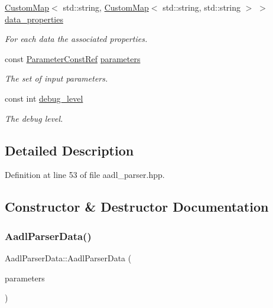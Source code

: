 \begin{DoxyCompactItemize}
\hyperlink{custom__map_8hpp_a18ca01763abbe3e5623223bfe5aaac6b}{Custom\+Map}$<$ std\+::string, \hyperlink{custom__map_8hpp_a18ca01763abbe3e5623223bfe5aaac6b}{Custom\+Map}$<$ std\+::string, std\+::string $>$ $>$ \hyperlink{structAadlParserData_a714f626b9b094cd0a06396bfaac29da3}{data\+\_\+properties}
\begin{DoxyCompactList}\small\item\em For each data the associated properties. \end{DoxyCompactList}\item 
const \hyperlink{Parameter_8hpp_a37841774a6fcb479b597fdf8955eb4ea}{Parameter\+Const\+Ref} \hyperlink{structAadlParserData_ad7836437c882428d2580f2e56d6cdc20}{parameters}
\begin{DoxyCompactList}\small\item\em The set of input parameters. \end{DoxyCompactList}\item 
const int \hyperlink{structAadlParserData_af4014ed6f035424d1e9a725115b73ee6}{debug\+\_\+level}
\begin{DoxyCompactList}\small\item\em The debug level. \end{DoxyCompactList}\end{DoxyCompactItemize}


\subsection{Detailed Description}


Definition at line 53 of file aadl\+\_\+parser.\+hpp.



\subsection{Constructor \& Destructor Documentation}
\mbox{\label{structAadlParserData_a38404f654c360ce6e2c6fddfa9fced7e}} 
\subsubsection{\texorpdfstring{Aadl\+Parser\+Data()}{AadlParserData()}}
{\footnotesize\ttfamily Aadl\+Parser\+Data\+::\+Aadl\+Parser\+Data (\begin{DoxyParamCaption}\item[{const \hyperlink{Parameter_8hpp_a37841774a6fcb479b597fdf8955eb4ea}{Parameter\+Const\+Ref}}]{parameters }\end{DoxyParamCaption})\hspace{0.3cm}{\ttfamily [explicit]}}



